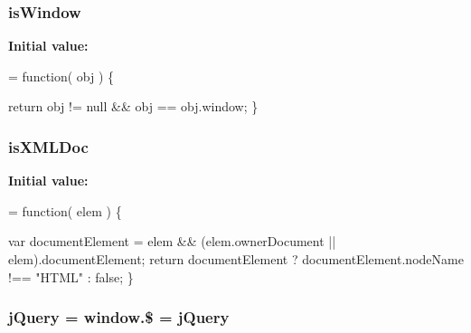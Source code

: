 \subsubsection[{is\+Window}]{ is\+Window}\label{jquery-1_810_82-vsdoc_8js_a6f58346d2509049e6186d923c99f005a}
{\bfseries Initial value\+:}
\begin{DoxyCode}
= \textcolor{keyword}{function}( obj ) \{


        
        \textcolor{keywordflow}{return} obj != null && obj == obj.window;
    \}
\end{DoxyCode}
\hypertarget{jquery-1_810_82-vsdoc_8js_acf4730466ce2c301378ee112fdba9139}{}
\subsubsection[{is\+X\+M\+L\+Doc}]{ is\+X\+M\+L\+Doc}\label{jquery-1_810_82-vsdoc_8js_acf4730466ce2c301378ee112fdba9139}
{\bfseries Initial value\+:}
\begin{DoxyCode}
= \textcolor{keyword}{function}( elem ) \{


    
    
    var documentElement = elem && (elem.ownerDocument || elem).documentElement;
    \textcolor{keywordflow}{return} documentElement ? documentElement.nodeName !== \textcolor{stringliteral}{"HTML"} : \textcolor{keyword}{false};
\}
\end{DoxyCode}
\hypertarget{jquery-1_810_82-vsdoc_8js_add5237586d970a38a81f990e8eb28c6c}{}
\subsubsection[{j\+Query}]{ j\+Query = window.\$ = j\+Query}\label{jquery-1_810_82-vsdoc_8js_add5237586d970a38a81f990e8eb28c6c}
\hypertarget{jquery-1_810_82-vsdoc_8js_af982393c1b8eb2a9ba4c7337f625ad89}{}
